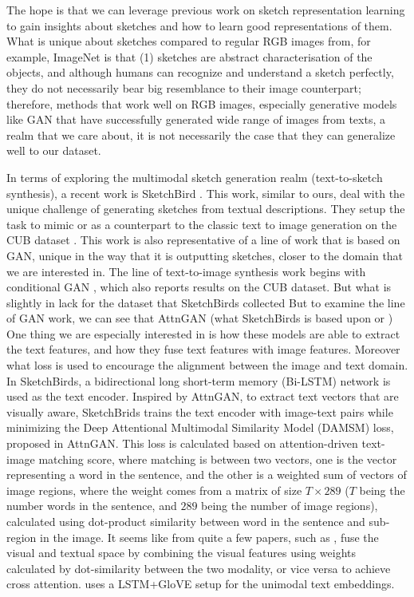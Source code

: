 The hope is that we can leverage previous work on sketch representation learning to gain insights about sketches and how to learn good representations of them. What is unique about sketches compared to regular RGB images from, for example, ImageNet is that (1) sketches are abstract characterisation of the objects, and although humans can recognize and understand a sketch perfectly, they do not necessarily bear big resemblance to their image counterpart; therefore, methods that work well on RGB images, especially generative models like GAN that have successfully generated wide range of images from texts, a realm that we care about, it is not necessarily the case that they can generalize well to our dataset.  




In terms of exploring the multimodal sketch generation realm (text-to-sketch synthesis), a recent work is SketchBird \citep{sketchbirds}. This work, similar to ours, deal with the unique challenge of generating sketches from textual descriptions. They setup the task to mimic or as a counterpart to the classic text to image generation on the CUB dataset \citep{WahCUB_200_2011}. 
This work is also representative of a line of work that is based on GAN, unique in the way that it is outputting sketches, closer to the domain that we are interested in.
The line of text-to-image synthesis work begins with conditional GAN \citep{cGAN_text_image}, which also reports results on the CUB dataset. But what is slightly in lack for the dataset that SketchBirds collected  
But to examine the line of GAN work, we can see that AttnGAN \citep{attngan_paper} (what SketchBirds is based upon or ) 
One thing we are especially interested in is how these models are able to extract the text features, and how they fuse text features with image features. Moreover what loss is used to encourage the alignment between the image and text domain. 
In SketchBirds, a bidirectional long short-term memory (Bi-LSTM) network is used as the text encoder. Inspired by AttnGAN, to extract text vectors that are visually aware, SketchBrids trains the text encoder with image-text pairs while minimizing the Deep Attentional Multimodal Similarity Model (DAMSM) loss, proposed in AttnGAN. This loss is calculated based on attention-driven text-image matching score, where matching is between two vectors, one is the vector representing a word in the sentence, and the other is a weighted sum of vectors of image regions, where the weight comes from a matrix of size $T\times 289$ ($T$ being the number words in the sentence, and $289$ being the number of image regions), calculated using dot-product similarity between word in the sentence and sub-region in the image. 
It seems like from quite a few papers, such as \cite{joyce-chai-zscl}, fuse the visual and textual space by combining the visual features using weights calculated by dot-similarity between the two modality, or vice versa to achieve cross attention. \cite{joyce-chai-zscl} uses a LSTM+GloVE setup for the unimodal text embeddings.       

